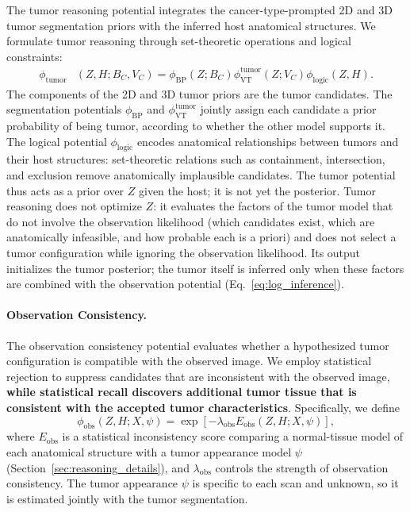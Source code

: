 \documentclass[fleqn,10pt]{olplainarticle}
\begin{document}
The tumor reasoning potential integrates
the cancer-type-prompted 2D and 3D tumor
segmentation priors with the inferred
host anatomical structures.
We formulate tumor reasoning through
set-theoretic operations and logical
constraints:
\begin{equation}
\label{eq:tumor_reasoning}
\begin{aligned}
\phi_{\mathrm{tumor}}
&(Z,H;B_C,V_C) =
\phi_{\mathrm{BP}}(Z;B_C)
\phi_{\mathrm{VT}}^{\mathrm{tumor}}(Z;V_C)
\phi_{\mathrm{logic}}(Z,H).
\end{aligned}
\end{equation}
The components of the 2D and 3D tumor priors are the
tumor candidates. The segmentation potentials
$\phi_{\mathrm{BP}}$ and $\phi_{\mathrm{VT}}^{\mathrm{tumor}}$
jointly assign each candidate a prior probability of being
tumor, according to whether the other model supports it.
The logical potential $\phi_{\mathrm{logic}}$ encodes
anatomical relationships between tumors
and their host structures:
set-theoretic relations
such as containment, intersection,
and exclusion remove anatomically
implausible candidates.
The tumor potential thus acts as a prior over $Z$ given
the host; it is not yet the posterior.
Tumor reasoning does not optimize $Z$: it evaluates the
factors of the tumor model that do not involve the observation
likelihood (which candidates
exist, which are anatomically infeasible, and how probable each
is a priori) and does not select a tumor configuration while
ignoring the observation likelihood.
Its output initializes the tumor posterior; the tumor itself is
inferred only when these factors are combined with the
observation potential (Eq.~\eqref{eq:log_inference}).

\paragraph{Observation Consistency.}

The observation consistency potential
evaluates whether a hypothesized tumor
configuration is compatible with the
observed image. We employ statistical rejection to suppress
candidates that are inconsistent
with the observed image, \textbf{while statistical recall discovers additional tumor tissue that is consistent with the accepted tumor characteristics}.
Specifically, we define
\begin{equation}
\label{eq:observation_potential}
\phi_{\mathrm{obs}}(Z,H;X,\psi)
=
\exp\left[
-\lambda_{\mathrm{obs}}
E_{\mathrm{obs}}(Z,H;X,\psi)
\right],
\end{equation}
where $E_{\mathrm{obs}}$ is a
statistical inconsistency score comparing a normal-tissue
model of each anatomical structure with a tumor appearance
model $\psi$ (Section~\ref{sec:reasoning_details}), and
$\lambda_{\mathrm{obs}}$ controls the
strength of observation consistency.
The tumor appearance $\psi$ is specific to each scan and
unknown, so it is estimated jointly with the tumor
segmentation.
\end{document}
